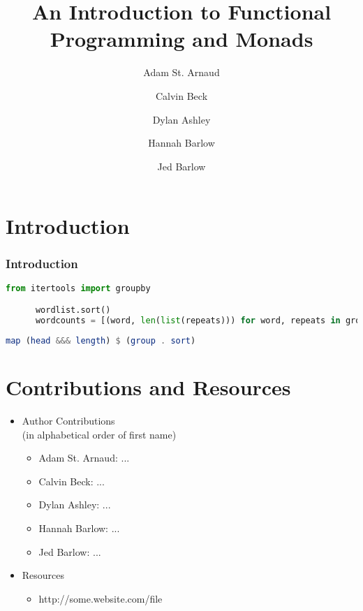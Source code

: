 \documentclass[]{beamer}
\title{An Introduction to Functional Programming and Monads}
\author{Adam St. Arnaud\\
  \and Calvin Beck\\
  \and Dylan Ashley\\
  \and Hannah Barlow\\
  \and Jed Barlow}
\begin{document}
\begin{frame}
\maketitle
\end{frame}

\section{Introduction}
\begin{frame}[fragile]
    \frametitle{Introduction}

    \begin{lstlisting}[frame=single,language=Python,breaklines=true]
      from itertools import groupby

      wordlist.sort()
      wordcounts = [(word, len(list(repeats))) for word, repeats in groupby(wordlist)]
    \end{lstlisting}

    \begin{lstlisting}[frame=single,language=Haskell,breaklines=true]
      map (head &&& length) $ (group . sort)
    \end{lstlisting}
\end{frame}

\section{Contributions and Resources}
\begin{frame}
    \begin{itemize}
        \item Author Contributions\\{\scriptsize(in alphabetical order of first name)}
            \begin{itemize}
                \item Adam St. Arnaud:
                    ...
                \item Calvin Beck:
                    ...
                \item Dylan Ashley:
                    ...
                \item Hannah Barlow:
                    ...
                \item Jed Barlow:
                    ...
            \end{itemize}
        \item Resources
            \begin{itemize}
                \item
                    http://some.website.com/file
            \end{itemize}
    \end{itemize}
\end{frame}
\end{document}
